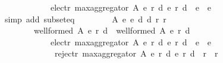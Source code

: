 \begin{isabellebody}
\ \ \ \ \ \ \ \ \ \ \ \ elect{\isacharunderscore}{\kern0pt}r\ {\isacharparenleft}{\kern0pt}max{\isacharunderscore}{\kern0pt}aggregator\ A\ {\isacharparenleft}{\kern0pt}e{}{\isacharcomma}{\kern0pt}\ r{}{\isacharcomma}{\kern0pt}\ d{}{\isacharparenright}{\kern0pt}\ {\isacharparenleft}{\kern0pt}e{}{\isacharcomma}{\kern0pt}\ r{}{\isacharcomma}{\kern0pt}\ d{}{\isacharparenright}{\kern0pt}{\isacharparenright}{\kern0pt}\ {\isasymsubseteq}\ {\isacharparenleft}{\kern0pt}e{}\ {\isasymunion}\ e{}{\isacharparenright}{\kern0pt}{\isachardoublequoteclose}\isanewline
\ \ \ \ \isamarkupfalse%
\ {\isacharparenleft}{\kern0pt}simp\ add{\isacharcolon}{\kern0pt}\ subset{\isacharunderscore}{\kern0pt}eq{\isacharparenright}{\kern0pt}\isanewline
\ \ \isamarkupfalse%
\ \isamarkupfalse%
\isanewline
\ \ \ \ {\isachardoublequoteopen}{\isasymforall}A\ e{}\ e{}\ d{}\ d{}\ r{}\ r{}{\isachardot}{\kern0pt}\isanewline
\ \ \ \ \ \ \ \ {\isacharparenleft}{\kern0pt}well{\isacharunderscore}{\kern0pt}formed\ A\ {\isacharparenleft}{\kern0pt}e{}{\isacharcomma}{\kern0pt}\ r{}{\isacharcomma}{\kern0pt}\ d{}{\isacharparenright}{\kern0pt}\ {\isasymand}\ well{\isacharunderscore}{\kern0pt}formed\ A\ {\isacharparenleft}{\kern0pt}e{}{\isacharcomma}{\kern0pt}\ r{}{\isacharcomma}{\kern0pt}\ d{}{\isacharparenright}{\kern0pt}{\isacharparenright}{\kern0pt}\ {\isasymlongrightarrow}\isanewline
\ \ \ \ \ \ \ \ \ \ \ \ {\isacharparenleft}{\kern0pt}elect{\isacharunderscore}{\kern0pt}r\ {\isacharparenleft}{\kern0pt}max{\isacharunderscore}{\kern0pt}aggregator\ A\ {\isacharparenleft}{\kern0pt}e{}{\isacharcomma}{\kern0pt}\ r{}{\isacharcomma}{\kern0pt}\ d{}{\isacharparenright}{\kern0pt}\ {\isacharparenleft}{\kern0pt}e{}{\isacharcomma}{\kern0pt}\ r{}{\isacharcomma}{\kern0pt}\ d{}{\isacharparenright}{\kern0pt}{\isacharparenright}{\kern0pt}\ {\isasymsubseteq}\ {\isacharparenleft}{\kern0pt}e{}\ {\isasymunion}\ e{}{\isacharparenright}{\kern0pt}\ {\isasymand}\isanewline
\ \ \ \ \ \ \ \ \ \ \ \ \ reject{\isacharunderscore}{\kern0pt}r\ {\isacharparenleft}{\kern0pt}max{\isacharunderscore}{\kern0pt}aggregator\ A\ {\isacharparenleft}{\kern0pt}e{}{\isacharcomma}{\kern0pt}\ r{}{\isacharcomma}{\kern0pt}\ d{}{\isacharparenright}{\kern0pt}\ {\isacharparenleft}{\kern0pt}e{}{\isacharcomma}{\kern0pt}\ r{}{\isacharcomma}{\kern0pt}\ d{}{\isacharparenright}{\kern0pt}{\isacharparenright}{\kern0pt}\ {\isasymsubseteq}\ {\isacharparenleft}{\kern0pt}r{}\ {\isasymunion}\ r{}{\isacharparenright}{\kern0pt}{\isacharparenright}{\kern0pt}{\isachardoublequoteclose}\isanewline

\end{isabellebody}
